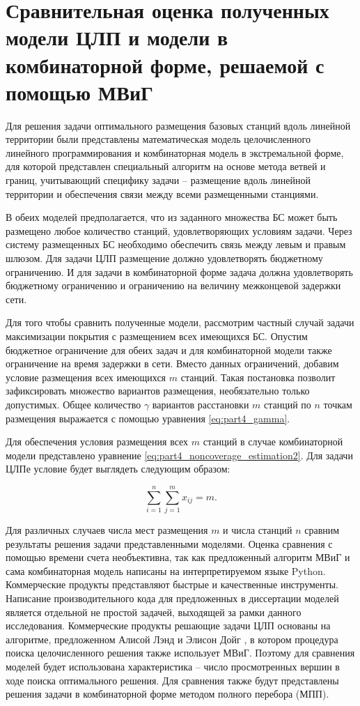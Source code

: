 \section{Сравнительная оценка полученных модели ЦЛП и модели в комбинаторной форме, решаемой с помощью МВиГ}
Для решения задачи оптимального размещения базовых станций вдоль линейной территории были представлены математическая модель целочисленного линейного программирования и комбинаторная модель в экстремальной форме, для которой представлен специальный алгоритм на основе метода ветвей и границ, учитывающий специфику задачи -- размещение вдоль линейной территории и обеспечения связи между всеми размещенными станциями.

В обеих моделей предполагается, что из заданного множества БС может быть размещено любое количество станций, удовлетворяющих условиям задачи. Через систему размещенных БС необходимо обеспечить связь между левым и правым шлюзом. Для задачи ЦЛП размещение должно удовлетворять бюджетному ограничению. И для задачи в комбинаторной форме задача должна удовлетворять бюджетному ограничению и ограничению на величину межконцевой задержки сети.

Для того чтобы сравнить полученные модели, рассмотрим частный случай задачи максимизации покрытия с размещением всех имеющихся БС. Опустим бюджетное ограничение для обеих задач и для комбинаторной модели также ограничение на время задержки в сети. Вместо данных ограничений, добавим условие размещения всех имеющихся $m$ станций. Такая постановка позволит зафиксировать множество вариантов размещения, необязательно только допустимых. Общее количество $\gamma$ вариантов расстановки $m$ станций по $n$ точкам размещения выражается с помощью уравнения \cref{eq:part4_gamma}.


Для обеспечения условия размещения всех $m$ станций в случае комбинаторной модели представлено уравнение \cref{eq:part4_noncoverage_estimation2}. Для задачи ЦЛПе условие будет выглядеть следующим образом:


\begin{equation}
  \label{eq:part3_placed_all_station}
  \sum\limits_{i=1}^n \sum\limits_{j=1}^m x_{ij} = m.
\end{equation}

Для различных случаев числа мест размещения $m$ и числа станций $n$ сравним результаты решения задачи представленными моделями. Оценка сравнения с помощью времени счета необъективна, так как предложенный алгоритм МВиГ и сама комбинаторная модель написаны на интерпретируемом языке Python. Коммерческие продукты представляют быстрые и качественные инструменты. Написание производительного кода для предложенных в диссертации моделей является отдельной не простой задачей, выходящей за рамки данного исследования. Коммерческие продукты решающие задачи ЦЛП основаны на алгоритме, предложенном Алисой Лэнд и Элисон Дойг \cite{Land1960}, в котором процедура поиска целочисленного решения также использует МВиГ.  Поэтому для сравнения моделей будет использована характеристика -- число просмотренных вершин в ходе поиска оптимального решения. Для сравнения также будут представлены решения задачи в комбинаторной форме методом полного перебора (МПП).


